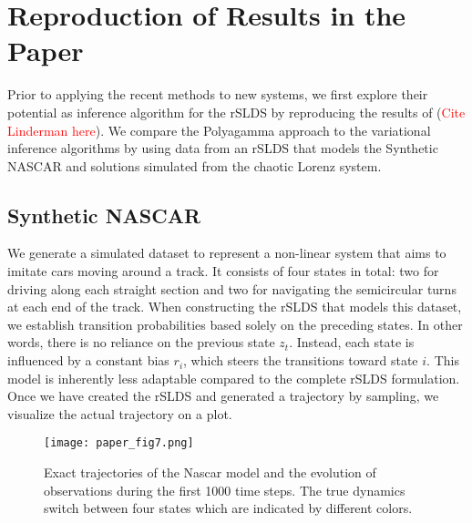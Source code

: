 
\section{Reproduction of Results in the Paper}

Prior to applying the recent methods to new systems, we first explore their potential as inference algorithm for the rSLDS by reproducing the results of (\textcolor{red}{Cite Linderman here}). We compare the Polyagamma approach to the variational inference algorithms by using data from an rSLDS that models the Synthetic NASCAR and solutions simulated from the chaotic Lorenz system.

\subsection{Synthetic NASCAR}

We generate a simulated dataset to represent a non-linear system that aims to imitate cars moving around a track. It consists of four states in total: two for driving along each straight section and two for navigating the semicircular turns at each end of the track. When constructing the rSLDS that models this dataset, we establish transition probabilities based solely on the preceding states. In other words, there is no reliance on the previous state $z_t$. Instead, each state is influenced by a constant bias $r_i$, which steers the transitions toward state $i$. This model is inherently less adaptable compared to the complete rSLDS formulation. Once we have created the rSLDS and generated a trajectory by sampling, we visualize the actual trajectory on a plot.
\begin{figure}[h!]
	\centering
	\texttt{[image: paper\_fig7.png]}
	\caption{Exact trajectories of the Nascar model and the evolution of observations during the first 1000 time steps. The true dynamics switch between four states which are indicated by different colors.}
	\label{trueNascar}
\end{figure}

